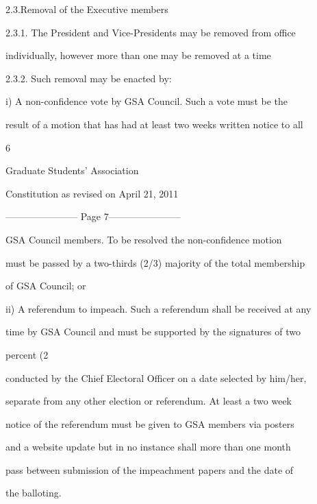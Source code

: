 \documentclass{article}
\begin{document}
  



2.3.Removal of the Executive members  



2.3.1. The   President   and  Vice-Presidents   may   be   removed   from   office  

individually, however more than one may be removed at a time  



2.3.2.  Such removal may be enacted by:  



i)      A  non-confidence  vote  by  GSA  Council.  Such  a  vote  must  be  the  

result of a motion that has had at least two weeks written notice to all  



 

       6  



Graduate Students’ Association  



   Constitution as revised on April 21, 2011  


----------------------- Page 7-----------------------

GSA  Council  members.  To  be  resolved  the  non-confidence  motion  

must  be passed by a two-thirds (2/3) majority of the total membership  

of GSA Council; or  



ii)     A referendum to impeach. Such a referendum shall be received at any  

time by GSA Council and must be supported by the signatures of two  

percent (2%

conducted by the Chief Electoral Officer on a date selected by him/her,  

separate from any other election or referendum. At least a two week  

notice of the referendum must be given to GSA members via posters  

and  a  website  update  but  in  no  instance  shall  more  than  one  month  

pass between submission  of the  impeachment  papers  and  the  date  of  

the balloting.  
\end{document}
